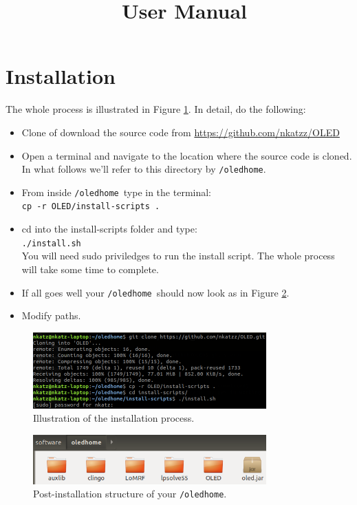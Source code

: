 \documentclass[12pt]{article}
\title{\oled \  User Manual}
\newcommand{\home}{\texttt{/oledhome}}
\begin{document}
\maketitle

\section{Installation}
The whole process is illustrated in Figure \ref{fig:terminal}. In detail, do the following:
\begin{itemize}
\item Clone of download the source code from \url{https://github.com/nkatzz/OLED} 
\item Open a terminal and navigate to the location where the source code is cloned. In what follows we'll refer to this directory by \home.
\item From inside \home \ type in the terminal: \\ \texttt{cp -r OLED/install-scripts .}
\item cd into the install-scripts folder and type:\\
\texttt{./install.sh}\\
You will need sudo priviledges to run the install script. The whole process will take some time to complete.
\item If all goes well your \home \ should now look as in Figure \ref{fig:install}.
\item Modify paths.

\end{itemize}


\begin{figure}[h]
\centering
\includegraphics[width=0.8\textwidth]{./figures/install}
\caption{Illustration of the installation process.}%
\label{fig:terminal}
\end{figure}

 

\begin{figure}[h]
\centering
\includegraphics[width=0.8\textwidth]{./figures/oledhome}
\caption{Post-installation structure of your \home.}%
\label{fig:install}
\end{figure}
\end{document}
